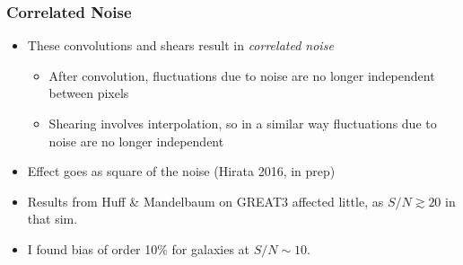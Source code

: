 \documentclass{beamer}
\begin{document}
\frame
{
    \frametitle{Correlated Noise}

 
    \begin{itemize}

        \item These convolutions and shears result in {\em {\color{brightred} correlated noise}}
            
        \begin{itemize}
            \item After convolution, fluctuations due to noise are no longer
                independent between pixels

            \item Shearing involves interpolation, so in a similar way fluctuations
                due to noise are no longer independent
        \end{itemize}

    \item Effect goes as {\color{orange} square} of the noise (Hirata 2016, in prep)

        \item Results from Huff \& Mandelbaum on GREAT3 affected little, as
            $S/N \gtrsim 20$ in that sim.

        \item I found bias of order 10\% for galaxies at $S/N \sim 10$.



    \end{itemize}

}


%
%
%
%
\end{document}
